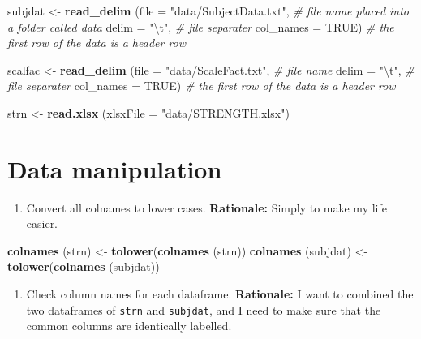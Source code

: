 \documentclass[
]{book}
\newenvironment{Shaded}{\begin{snugshade}}{\end{snugshade}}
\newcommand{\CharTok}[1]{\textcolor[rgb]{0.31,0.60,0.02}{#1}}
\newcommand{\CommentTok}[1]{\textcolor[rgb]{0.56,0.35,0.01}{\textit{#1}}}
\newcommand{\DataTypeTok}[1]{\textcolor[rgb]{0.13,0.29,0.53}{#1}}
\newcommand{\KeywordTok}[1]{\textcolor[rgb]{0.13,0.29,0.53}{\textbf{#1}}}
\newcommand{\NormalTok}[1]{#1}
\newcommand{\OtherTok}[1]{\textcolor[rgb]{0.56,0.35,0.01}{#1}}
\newcommand{\StringTok}[1]{\textcolor[rgb]{0.31,0.60,0.02}{#1}}
\providecommand{\tightlist}{%
  \setlength{\itemsep}{0pt}\setlength{\parskip}{0pt}}
\begin{document}
\begin{Shaded}
\begin{Highlighting}[]
\NormalTok{subjdat <-}\StringTok{  }\KeywordTok{read_delim}\NormalTok{ (}\DataTypeTok{file =} \StringTok{"data/SubjectData.txt"}\NormalTok{, }\CommentTok{# file name placed into a folder called data}
                        \DataTypeTok{delim =} \StringTok{"}\CharTok{\textbackslash{}t}\StringTok{"}\NormalTok{, }\CommentTok{# file separater}
                        \DataTypeTok{col_names =} \OtherTok{TRUE}\NormalTok{) }\CommentTok{# the first row of the data is a header row}

\NormalTok{scalfac <-}\StringTok{  }\KeywordTok{read_delim}\NormalTok{ (}\DataTypeTok{file =} \StringTok{"data/ScaleFact.txt"}\NormalTok{, }\CommentTok{# file name}
                        \DataTypeTok{delim =} \StringTok{"}\CharTok{\textbackslash{}t}\StringTok{"}\NormalTok{, }\CommentTok{# file separater}
                        \DataTypeTok{col_names =} \OtherTok{TRUE}\NormalTok{) }\CommentTok{# the first row of the data is a header row}

\NormalTok{strn <-}\StringTok{  }\KeywordTok{read.xlsx}\NormalTok{ (}\DataTypeTok{xlsxFile =} \StringTok{"data/STRENGTH.xlsx"}\NormalTok{)}
\end{Highlighting}
\end{Shaded}

\hypertarget{data-manipulation}{%
\section{Data manipulation}\label{data-manipulation}}

\begin{enumerate}
\def\labelenumi{\arabic{enumi}.}
\tightlist
\item
  Convert all colnames to lower cases. \textbf{Rationale:} Simply to make my life easier.
\end{enumerate}

\begin{Shaded}
\begin{Highlighting}[]
\KeywordTok{colnames}\NormalTok{ (strn) <-}\StringTok{  }\KeywordTok{tolower}\NormalTok{(}\KeywordTok{colnames}\NormalTok{ (strn))}
\KeywordTok{colnames}\NormalTok{ (subjdat) <-}\StringTok{  }\KeywordTok{tolower}\NormalTok{(}\KeywordTok{colnames}\NormalTok{ (subjdat))}
\end{Highlighting}
\end{Shaded}

\begin{enumerate}
\def\labelenumi{\arabic{enumi}.}
\setcounter{enumi}{1}
\tightlist
\item
  Check column names for each dataframe. \textbf{Rationale:} I want to combined the two dataframes of \texttt{strn} and \texttt{subjdat}, and I need to make sure that the common columns are identically labelled.
\end{enumerate}
\end{document}
